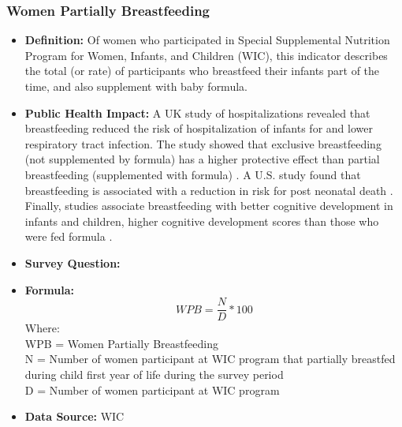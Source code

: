 \documentclass[12pt,letterpaper]{report}
\begin{document}
\subsubsection{Women Partially Breastfeeding}
\begin{itemize}
		\item \textbf{Definition:} Of women who participated in Special Supplemental Nutrition Program for Women, Infants, and Children (WIC), this indicator describes the total (or rate) of participants who breastfeed their infants part of the time, and also supplement with baby formula. 
		\item \textbf{Public Health Impact:} A UK study of hospitalizations revealed that breastfeeding reduced the risk of hospitalization of infants for and lower respiratory tract infection. The study showed that exclusive breastfeeding (not supplemented by formula) has a higher protective effect than partial breastfeeding (supplemented with formula) \cite{quigley2007breastfeeding}. A U.S. study found that breastfeeding is associated with a reduction in risk for post neonatal death \cite{chen2004breastfeeding}. Finally, studies associate breastfeeding with better cognitive development in infants and children, higher cognitive development scores than those who were fed formula \cite{anderson1999breast}. 
		\item \textbf{Survey Question:}
		\item \textbf{Formula:} 
			\begin{equation}
				WPB = \frac{N}{D} *100
			\end{equation}
Where: \\
			WPB = Women Partially Breastfeeding \\
			
			N = Number of women participant at WIC program that partially breastfed during child first year of life during the survey period \\
			
			D = Number of women participant at WIC program \\
			
			
		\item \textbf{Data Source:} WIC
	\end{itemize}
\end{document}
